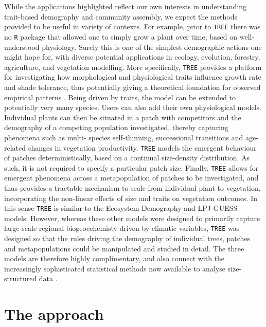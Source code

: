 \documentclass[a4paper,11pt]{article}
\begin{document}
While the applications highlighted reflect our own interests in understanding
trait-based demography and community assembly, we expect the methods provided
to be useful in variety of contexts. For example, prior to \texttt{TREE} there
was no \texttt{R} package that allowed one to simply grow a plant over time,
based on well-understood physiology. Surely this is one of the simplest
demographic actions one might hope for, with diverse potential applications in
ecology, evolution, forestry, agriculture, and vegetation modelling. More
specifically, \texttt{TREE} provides a  platform for investigating how
morphological and physiological traits influence  growth rate and shade
tolerance, thus potentially giving a theoretical foundation  for observed
empirical patterns \citep{Wright-2010,Baltzer-2007}. Being driven by traits,
the model can be extended to potentially very many species. Users can also 
add their own physiological models. Individual plants
can then be  situated in a patch with competitors and the demography of a
competing population  investigated, thereby capturing phenomena such as multi-
species self-thinning,  successional transitions and age-related changes in
vegetation productivity. \texttt{TREE}  models the emergent behaviour of
patches deterministically, based on a continual  size-density distribution. As
such, it is not required to specify a particular patch size.  Finally,
\texttt{TREE} allows for emergent phenomena across a metapopulation of patches
to  be investigated, and thus provides a tractable mechanism to scale from
individual plant to  vegetation, incorporating the non-linear effects of size
and traits on vegetation outcomes. In  this sense \texttt{TREE} is similar to
the Ecosystem Demography \citep{Moorcroft-2001}  and LPJ-GUESS
\citep{Smith-2014} models. However, whereas these other models were designed
to primarily capture large-scale regional biogeocehcmisty driven by climatic
variables,  \texttt{TREE} was designed so that the rules driving the
demography of individual trees, patches and metapopulations could be
manipulated and studied in detail. The three models are therefore highly 
complimentary, and also connect with the increasingly sophisticated statistical 
methods now available to analyse size-structured data \citep[e.g.][]{Metcalf-2013}.

\section{The approach}
\end{document}
